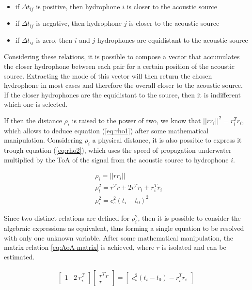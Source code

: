 \begin{itemize}
	\item if $ \Delta t_{ij}$ is positive, then hydrophone $i$ is closer to the acoustic source
	\item if $ \Delta t_{ij}$ is negative, then hydrophone $j$ is closer to the acoustic source
	\item if $ \Delta t_{ij}$ is zero, then $i$ and $j$ hydrophones are equidistant to the acoustic source
\end{itemize}

Considering these relations, it is possible to compose a vector that accumulates the closer hydrophone between each pair for a certain position of the acoustic source. Extracting the mode of this vector will then return the chosen hydrophone in most cases and therefore the overall closer to the acoustic source. If the closer hydrophones are the equidistant to the source, then it is indifferent which one is selected.  

If then the distance $\rho_i$ is raised to the power of two, we know that $||rr_i||^2 = r_i^{T}r_i$, which allows to deduce equation (\ref{eq:rho1}) after some mathematical manipulation. Considering $\rho_i$ a physical distance, it is also possible to express it trough equation (\ref{eq:rho2}), which uses the speed of propagation underwater multiplied by the ToA of the signal from the acoustic source to hydrophone $i$.

\begin{eqnarray}
	& \rho_i = ||rr_i|| 
	\label{eq:rho}\\
	&\rho_i^{2} =  r^{T}r + 2r^{T}r_i + r_i^{T}r_i
	\label{eq:rho1}\\
	&\rho_i^{2} = c_s^{2} (t_i-t_0)^{2}
	\label{eq:rho2}
\end{eqnarray}

Since two distinct relations are defined for $\rho_i^{2}$, then it is possible to consider the algebraic expressions as equivalent, thus forming a single equation to be resolved with only one unknown variable. After some mathematical manipulation, the matrix relation \ref{eq:AoA-matrix} is achieved, where $r$ is isolated and can be estimated.

\begin{eqnarray}
	\begin{bmatrix}
		1 & 2\: r_i^{T}
	\end{bmatrix}
	\begin{bmatrix}
		r^{T} r \\
		r
	\end{bmatrix}
	=  
	\begin{bmatrix}
		c_s^{2} (t_i-t_0) - r_i^{T} r_i
	\end{bmatrix}
	\label{eq:AoA-matrix}
\end{eqnarray}

